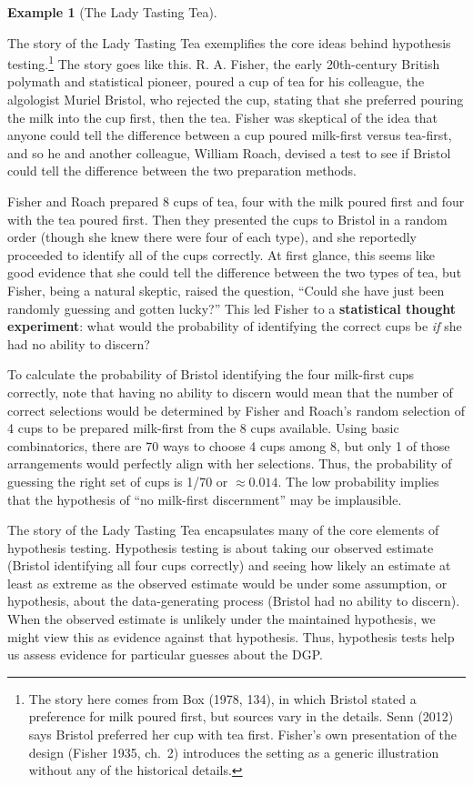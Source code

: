 \documentclass[
  13pt,
  letterpaper,
  DIV=11,
  numbers=noendperiod]{scrreprt}
\theoremstyle{plain}
\theoremstyle{plain}
\theoremstyle{definition}
\theoremstyle{definition}
\newtheorem{example}{Example}[chapter]
\theoremstyle{remark}
\begin{document}
\begin{example}[The Lady Tasting
Tea]\protect\hypertarget{exm-lady-tasting-tea}{}\label{exm-lady-tasting-tea}

The story of the Lady Tasting Tea exemplifies the core ideas behind
hypothesis testing.\footnote{The story here comes from Box (1978, 134),
  in which Bristol stated a preference for milk poured first, but
  sources vary in the details. Senn (2012) says Bristol preferred her
  cup with tea first. Fisher's own presentation of the design (Fisher
  1935, ch.~2) introduces the setting as a generic illustration without
  any of the historical details.} The story goes like this. R. A.
Fisher, the early 20th-century British polymath and statistical pioneer,
poured a cup of tea for his colleague, the algologist Muriel Bristol,
who rejected the cup, stating that she preferred pouring the milk into
the cup first, then the tea. Fisher was skeptical of the idea that
anyone could tell the difference between a cup poured milk-first versus
tea-first, and so he and another colleague, William Roach, devised a
test to see if Bristol could tell the difference between the two
preparation methods.

Fisher and Roach prepared 8 cups of tea, four with the milk poured first
and four with the tea poured first. Then they presented the cups to
Bristol in a random order (though she knew there were four of each
type), and she reportedly proceeded to identify all of the cups
correctly. At first glance, this seems like good evidence that she could
tell the difference between the two types of tea, but Fisher, being a
natural skeptic, raised the question, ``Could she have just been
randomly guessing and gotten lucky?'' This led Fisher to a
\textbf{statistical thought experiment}: what would the probability of
identifying the correct cups be \emph{if} she had no ability to discern?

To calculate the probability of Bristol identifying the four milk-first
cups correctly, note that having no ability to discern would mean that
the number of correct selections would be determined by Fisher and
Roach's random selection of 4 cups to be prepared milk-first from the 8
cups available. Using basic combinatorics, there are 70 ways to choose 4
cups among 8, but only 1 of those arrangements would perfectly align
with her selections. Thus, the probability of guessing the right set of
cups is 1/70 or \(\approx 0.014\). The low probability implies that the
hypothesis of ``no milk-first discernment'' may be implausible.

The story of the Lady Tasting Tea encapsulates many of the core elements
of hypothesis testing. Hypothesis testing is about taking our observed
estimate (Bristol identifying all four cups correctly) and seeing how
likely an estimate at least as extreme as the observed estimate would be
under some assumption, or hypothesis, about the data-generating process
(Bristol had no ability to discern). When the observed estimate is
unlikely under the maintained hypothesis, we might view this as evidence
against that hypothesis. Thus, hypothesis tests help us assess evidence
for particular guesses about the DGP.

\end{example}
\end{document}
